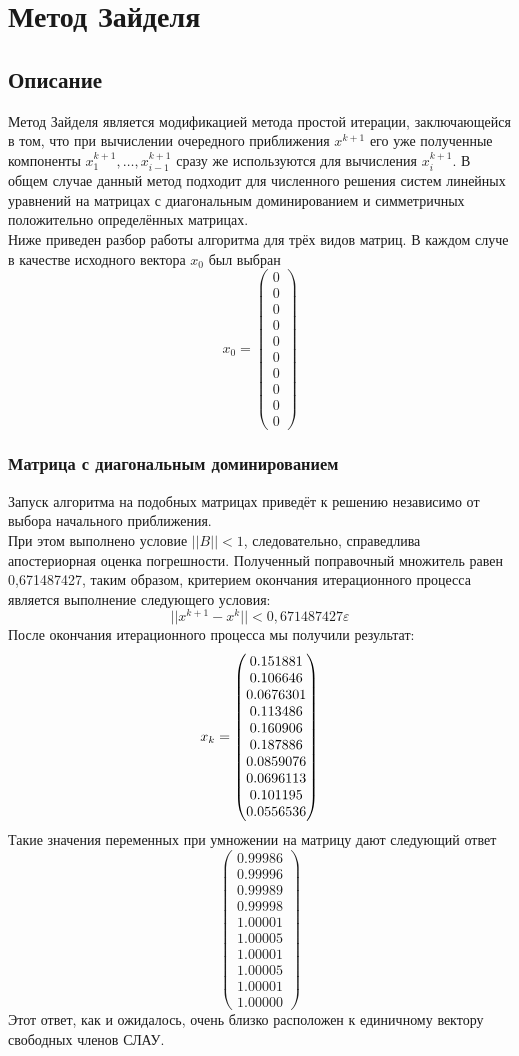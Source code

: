 \documentclass[../../report.tex]{subfiles}
\begin{document}
\chapter{Метод Зайделя}

\section{Описание}
Метод Зайделя является модификацией метода простой итерации, заключающейся в том, что при вычислении 
очередного приближения $x^{k+1}$ его уже полученные компоненты $x_1^{k+1},\dots,x_{i-1}^{k+1}$ сразу 
же используются для вычисления $x_i^{k+1}$. В общем случае данный метод подходит для численного решения 
систем линейных уравнений на матрицах с диагональным доминированием и симметричных положительно определённых матрицах. \\
Ниже приведен разбор работы алгоритма для трёх видов матриц. В каждом случе в качестве исходного вектора $x_0$ был выбран 
\[
x_0 = 
\begin{pmatrix} 
  0 \\ 
  0 \\ 
  0 \\ 
  0 \\ 
  0 \\ 
  0 \\ 
  0 \\ 
  0 \\ 
  0 \\ 
  0 
\end{pmatrix}
\]

\subsection{Матрица с диагональным доминированием}
Запуск алгоритма на подобных матрицах приведёт к 
решению независимо от выбора начального приближения. \\
При этом выполнено условие $||B|| < 1$, следовательно, справедлива апостериорная оценка погрешности. Полученный поправочный множитель равен 0,671487427, таким образом, критерием окончания итерационного процесса является выполнение следующего условия:
$$||x^{k+1} - x^k|| < 0,671487427\varepsilon$$
После окончания итерационного процесса мы получили результат:
\[
x_k = \begin{pmatrix} 0.151881 \\ 0.106646 \\ 0.0676301 \\ 0.113486 \\ 0.160906 \\ 0.187886 \\ 0.0859076 \\ 0.0696113 \\ 0.101195 \\ 0.0556536 \end{pmatrix}
\]
Такие значения переменных при умножении на матрицу дают следующий ответ
\[
\begin{pmatrix}
  0.99986 \\
  0.99996 \\
  0.99989 \\
  0.99998 \\
  1.00001 \\
  1.00005 \\
  1.00001 \\
  1.00005 \\
  1.00001 \\
  1.00000
\end{pmatrix}
\]
Этот ответ, как и ожидалось, очень близко расположен к единичному вектору свободных членов СЛАУ.
\end{document}
